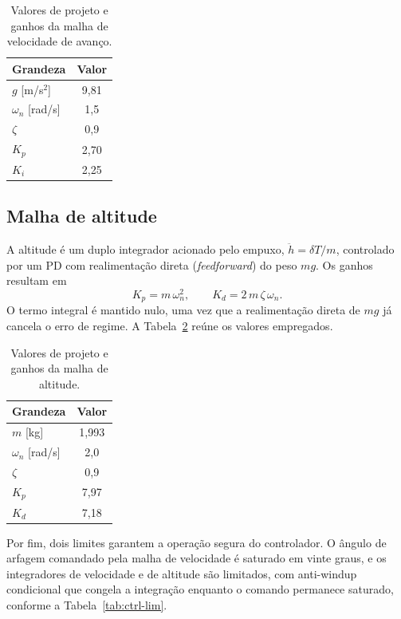 \begin{table}[ht]
\centering
\caption{Valores de projeto e ganhos da malha de velocidade de avanço.}
\label{tab:gain-u}
\begin{tabular}{l c}
\toprule
Grandeza & Valor \\
\midrule
$g$ [m/s$^2$]      & 9,81 \\
$\omega_n$ [rad/s] & 1,5  \\
$\zeta$            & 0,9  \\
$K_p$              & 2,70 \\
$K_i$              & 2,25 \\
\bottomrule
\end{tabular}
\end{table}

\subsection{Malha de altitude}

A altitude é um duplo integrador acionado pelo empuxo, $\ddot{h}=\delta T/m$, controlado por um PD com realimentação direta (\textit{feedforward}) do peso $m g$. Os ganhos resultam em
\begin{equation}
K_p=m\,\omega_n^2, \qquad K_d=2\,m\,\zeta\,\omega_n.
\label{eq:gain-h}
\end{equation}
O termo integral é mantido nulo, uma vez que a realimentação direta de $mg$ já cancela o erro de regime. A Tabela~\ref{tab:gain-h} reúne os valores empregados.

\begin{table}[ht]
\centering
\caption{Valores de projeto e ganhos da malha de altitude.}
\label{tab:gain-h}
\begin{tabular}{l c}
\toprule
Grandeza & Valor \\
\midrule
$m$ [kg]           & 1,993 \\
$\omega_n$ [rad/s] & 2,0  \\
$\zeta$            & 0,9  \\
$K_p$              & 7,97 \\
$K_d$              & 7,18 \\
\bottomrule
\end{tabular}
\end{table}

Por fim, dois limites garantem a operação segura do controlador. O ângulo de arfagem comandado pela malha de velocidade é saturado em vinte graus, e os integradores de velocidade e de altitude são limitados, com anti-windup condicional que congela a integração enquanto o comando permanece saturado, conforme a Tabela~\ref{tab:ctrl-lim}.

